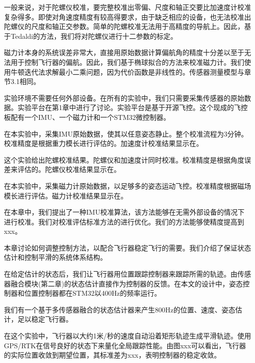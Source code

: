 \documentclass[
  type=master
]{gdutthesis}
\begin{document}
一般来说，对于陀螺仪校准，要完整校准出零偏、尺度和轴正交要比加速度计校准复杂得多。即使对角速度精度有较高得要求，由于缺乏相应的设备，也无法校准出陀螺仪的尺度和轴正交参数。简单的陀螺校准无法用于高精度的导航上。因此，基于Tedaldi的方法\cite{tedaldi2014robust}，我们将对陀螺仪进行十二参数的标定。

磁力计本身的系统误差非常大，直接用原始数据计算偏航角的精度十分差以至于无法用于控制飞行器的偏航。因此，我们基于椭球拟合的方法来校准磁力计\cite{李勇2012基于椭球拟合的三轴磁传感器误差补偿方法}。我们使用牛顿迭代法求解最小二乘问题，因为代价函数是非线性的。传感器测量模型与章节3.1相同。

实验环境不需要任何外部设备。在所有的实验中，我们只需要采集传感器的原始数据。实验平台在第1章中进行了讨论。实验平台是基于开源飞控。这个现成的飞控板配有一个IMU、一个磁力计和一个STM32微控制器。

在本实验中，采集IMU原始数据，使其以任意姿态静止。整个校准流程为3分钟。校准精度是根据重力模长进行评估的。加速度计校准结果显示在。

这个实验给出陀螺校准结果。陀螺仪和加速度计同时校准。校准精度是根据角度误差来评估的。陀螺仪校准结果显示在。

在本实验中，采集磁力计原始数据，以足够多的姿态运动飞控。校准精度根据磁场模长进行评估。磁力计校准结果显示在。

在本章中，我们提出了一种IMU校准算法，该方法能够在无需外部设备的情况下进行校准。我们对校准评估标准方法的进行优化。我们的方法能够使精度提高到xxx。

本章讨论如何调整控制方法，以配合飞行器稳定飞行的需要。我们介绍了保证状态估计和控制平滑的系统体系结构。

在给定估计的状态后，我们让飞行器用位置跟踪控制器来跟踪所需的轨迹\cite{lee2010geometric}。由传感器融合模块(第二章)的状态估计直接作为控制器的反馈。在本文的设计中，姿态控制器和位置控制器都在STM32以400Hz的频率运行。

我们有一个基于多传感器融合的状态估计器来产生800Hz的位置、速度、姿态估计，足以稳定飞行器。\par
在这个实验中，飞行器以大约1米/秒的速度自动沿着矩形轨迹生成平滑轨迹。使用GPS/RTK在信号良好的状态下来量化全局跟踪性能。由图xxx可以看出，飞行器的实际位置收敛到期望位置，其标准差为xxx，表明控制器的稳定收敛。
\end{document}
